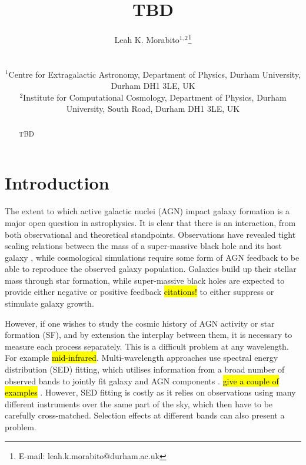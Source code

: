 \documentclass[usenatbib,fleqn,letters]{mnras}
\title[TBD]{TBD}
\author[L.K. Morabito]{\parbox{\textwidth}{Leah K. Morabito$^{1,2}$\thanks{E-mail: leah.k.morabito@durham.ac.uk}\orcidlink{0000-0003-0487-6651}\\}\\ 
$^{1}$Centre for Extragalactic Astronomy, Department of Physics, Durham University, Durham DH1 3LE, UK \\
$^{2}$Institute for Computational Cosmology, Department of Physics, Durham University, South Road, Durham DH1 3LE, UK \\ }
\begin{document}
\date{}
\pagerange{\pageref{firstpage}--\pageref{lastpage}} 
\maketitle

\label{firstpage}


\begin{abstract}
    TBD
    \vspace{6.75in}
\end{abstract}




\section{Introduction}
\label{sec:intro}
The extent to which active galactic nuclei (AGN) impact galaxy formation is a major open question in astrophysics. It is clear that there is an interaction, from both observational and theoretical standpoints. Observations have revealed tight scaling relations between the mass of a super-massive black hole and its host galaxy \citep[see, e.g.][and references therein]{kormendy_coevolution_2013}, while cosmological simulations require some form of AGN feedback \citep{bower_breaking_2006,croton_many_2006} to be able to reproduce the observed galaxy population. Galaxies build up their stellar mass through star formation, while super-massive black holes are expected to provide either negative or positive feedback \hl{citations!} to either suppress or stimulate galaxy growth. 

However, if one wishes to study the cosmic history of AGN activity or star formation (SF), and by extension the interplay between them, it is necessary to measure each process separately. This is a difficult problem at any wavelength. For example \hl{mid-infrared}. Multi-wavelength approaches use spectral energy distribution (SED) fitting, which utilises information from a broad number of observed bands to jointly fit galaxy and AGN components \citep{pacifici_art_2022}. \hl{give a couple of examples} \citep{calistro_rivera_agnfitter_2016,boquien_cigale_2019}. However, SED fitting is costly as it relies on observations using many different instruments over the same part of the sky, which then have to be carefully cross-matched. Selection effects at different bands can also present a problem. 


\end{document}
